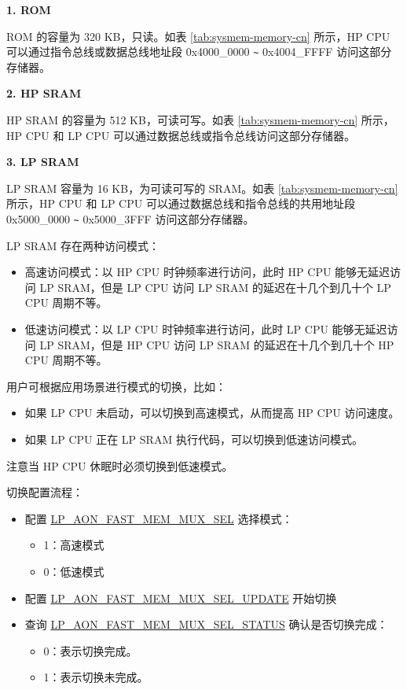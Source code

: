 \documentclass[main\_\_CN.tex]{subfiles}
\begin{document}
{\bfseries 1. ROM}

ROM 的容量为 320 KB，只读。如表 \ref{tab:sysmem-memory-cn} 所示，HP CPU 可以通过指令总线或数据总线地址段 0x4000\_0000 \verb+~+ 0x4004\_FFFF 访问这部分存储器。


{\bfseries 2. HP SRAM}
\label{other:sysmem-internal-sram-0}

HP SRAM 的容量为 512 KB，可读可写。如表 \ref{tab:sysmem-memory-cn} 所示，HP CPU 和 LP CPU 可以通过数据总线或指令总线访问这部分存储器。



{\bfseries 3. LP SRAM}

LP SRAM 容量为 16 KB，为可读可写的 SRAM。如表 \ref{tab:sysmem-memory-cn} 所示，HP CPU 和 LP CPU 可以通过数据总线和指令总线的共用地址段 0x5000\_0000 \verb+~+ 0x5000\_3FFF 访问这部分存储器。

LP SRAM 存在两种访问模式：
\begin{itemize}
    \item 高速访问模式：以 HP CPU 时钟频率进行访问，此时 HP CPU 能够无延迟访问 LP SRAM，但是 LP CPU 访问 LP SRAM 的延迟在十几个到几十个 LP CPU 周期不等。
    \item 低速访问模式：以 LP CPU 时钟频率进行访问，此时 LP CPU 能够无延迟访问 LP SRAM，但是 HP CPU 访问 LP SRAM 的延迟在十几个到几十个 HP CPU 周期不等。
\end{itemize}

用户可根据应用场景进行模式的切换，比如：
\begin{itemize}
    \item 如果 LP CPU 未启动，可以切换到高速模式，从而提高 HP CPU 访问速度。
    \item 如果 LP CPU 正在 LP SRAM 执行代码，可以切换到低速访问模式。
\end{itemize}
注意当 HP CPU 休眠时必须切换到低速模式。

切换配置流程：
\begin{itemize}
    \item 配置 \hyperref[fielddesc:LPAONFASTMEMMUXSEL]{LP\_AON\_FAST\_MEM\_MUX\_SEL} 选择模式：
    \begin{itemize}
        \item 1：高速模式
        \item 0：低速模式
    \end{itemize}
    \item 配置 \hyperref[fielddesc:LPAONFASTMEMMUXSELUPDATE]{LP\_AON\_FAST\_MEM\_MUX\_SEL\_UPDATE} 开始切换
    \item 查询 \hyperref[fielddesc:LPAONFASTMEMMUXSELSTATUS]{LP\_AON\_FAST\_MEM\_MUX\_SEL\_STATUS} 确认是否切换完成：
    \begin{itemize}
        \item 0：表示切换完成。
        \item 1：表示切换未完成。
    \end{itemize}
\end{itemize}
\end{document}
